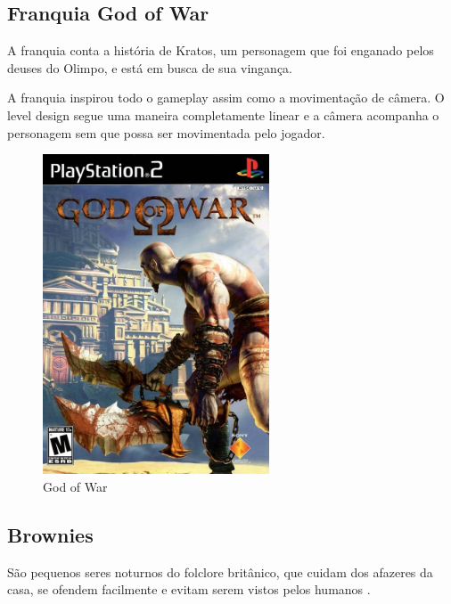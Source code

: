 \clearpage

\subsection{Franquia God of War}
A franquia conta a história de Kratos, um personagem que foi enganado pelos deuses do Olimpo, e está em busca de sua vingança.

A franquia inspirou todo o gameplay assim como a movimentação de câmera. O level design segue uma maneira completamente linear e a câmera acompanha o personagem sem que possa ser movimentada pelo jogador.

\begin{figure}[!htb] \caption{\label{god_of_war}God of War} \begin{center}
\includegraphics[width=0.6\textwidth]{imagens/GodofWar.jpg} \end{center}
 \end{figure}

\clearpage

\subsection{Brownies}

São pequenos seres noturnos do folclore britânico, que cuidam dos afazeres da casa, se ofendem facilmente e evitam serem vistos pelos humanos \cite{britannica_2011, carolyn_2016}.

